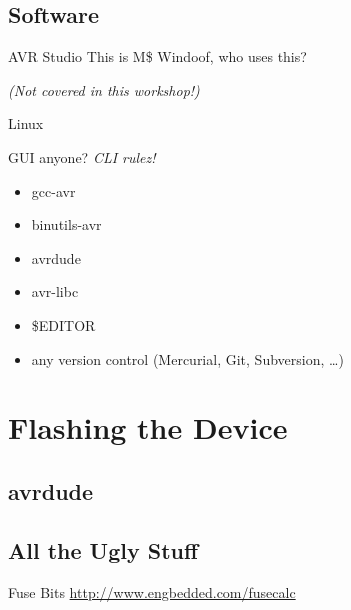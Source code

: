 \documentclass{beamer}
\begin{document}

\subsection{Software}

\begin{frame}{AVR Studio}
    This is M\$ Windoof, who uses this?

    \pause

    \emph{(Not covered in this workshop!)}
\end{frame}

\begin{frame}{Linux}
    \begin{block}{GUI anyone?}
        \emph{CLI rulez!}
    \end{block}
    \begin{itemize}
        \item gcc-avr
        \item binutils-avr
        \item avrdude
        \item avr-libc
        \item \$EDITOR
        \item any version control (Mercurial, Git, Subversion, …)
    \end{itemize}
\end{frame}

\section{Flashing the Device}

\subsection{avrdude}

\subsection{All the Ugly Stuff}

\begin{frame}{Fuse Bits}
    \url{http://www.engbedded.com/fusecalc}
\end{frame}
\end{document}
